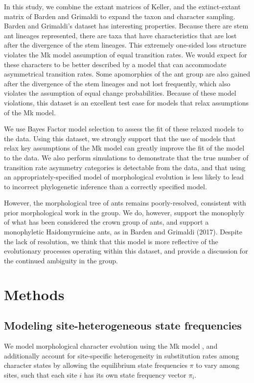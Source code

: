 \documentclass[]{sysbio}
\begin{document}
In this study, we combine the extant matrices of Keller, and the extinct-extant matrix of Barden and Grimaldi to expand the taxon and character sampling.  
Barden and Grimaldi's dataset has interesting properties.
Because there are stem ant lineages represented, there are taxa that have characteristics that are lost after the divergence of the stem lineages.
This extremely one-sided loss structure violates the Mk model assumption of equal transition rates. 
We would expect for these characters to be better described by a model that can accommodate asymmetrical transition rates.
Some apomorphies of the ant group are also gained after the divergence of the stem lineages and not lost frequently, which also violates the assumption of equal change probabilities.
Because of these model violations, this dataset is an excellent test case for models that relax assumptions of the Mk model. \par
We use Bayes Factor model selection to assess the fit of these relaxed models to the data.
Using this dataset, we strongly support that the use of models that relax key assumptions of the Mk model can greatly improve the fit of the model to the data.
We also perform simulations to demonstrate that the true number of transition rate asymmetry categories is detectable from the data, and that using an appropriately-specified model of morphological evolution is less likely to lead to incorrect phylogenetic inference than a correctly specified model.\par
However, the morphological tree of ants remains poorly-resolved, consistent with prior morphological work in the group.
We do, however, support the monophyly of what  has been considered the crown group of ants, and support a monophyletic Haidomyrmicine ants, as in Barden and Grimaldi (2017). 
Despite the lack of resolution, we think that this model is more reflective of the evolutionary processes operating within this dataset, and provide a discussion for the continued ambiguity in the group. \par

\section{Methods}

\subsection{Modeling site-heterogeneous state frequencies}

We model morphological character evolution using the Mk model \citep{lewis2001likelihood}, and additionally account for site-specific heterogeneity in substitution rates among character states by allowing the equilibrium state frequencies $\pi$ to vary among sites, such that each site $i$ has its own state frequency vector $\pi_i$.
\end{document}
